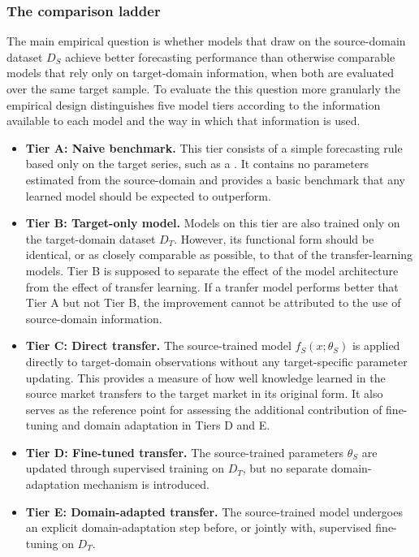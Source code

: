 \subsubsection{The comparison ladder} \label{subsubsec: methodology_the comparison ladder}
The main empirical question is whether models that draw on the source-domain dataset $D_S$ achieve better forecasting performance than otherwise comparable models that rely only on target-domain information, when both are evaluated over the same target sample. To evaluate the this question more granularly the empirical design distinguishes five model tiers according to the information available to each model and the way in which that information is used.
\begin{itemize}
    \item \textbf{Tier A: Naive benchmark.} This tier consists of a simple forecasting rule based only on the target series, such as a . It contains no parameters estimated from the source-domain and provides a basic benchmark that any learned model should be expected to outperform.
    \item \textbf{Tier B: Target-only model.} Models on this tier are also trained only on the target-domain dataset $D_T$. However, its functional form should be identical, or as closely comparable as possible, to that of the transfer-learning models. Tier B is supposed to separate the effect of the model architecture from the effect of transfer learning. If a tranfer model performs better that Tier A but not Tier B, the improvement cannot be attributed to the use of source-domain information.
    \item \textbf{Tier C: Direct transfer.} The source-trained model $f_S(x;\theta_S)$ is applied directly to target-domain observations without any target-specific parameter updating. This provides a measure of how well knowledge learned in the source market transfers to the target market in its original form. It also serves as the reference point for assessing the additional contribution of fine-tuning and domain adaptation in Tiers D and E.
    \item \textbf{Tier D: Fine-tuned transfer.} The source-trained parameters $\theta_S$ are updated through supervised training on $D_T$, but no separate domain-adaptation mechanism is introduced.
    \item \textbf{Tier E: Domain-adapted transfer.} The source-trained model undergoes an explicit domain-adaptation step before, or jointly with, supervised fine-tuning on $D_T$.
\end{itemize}

